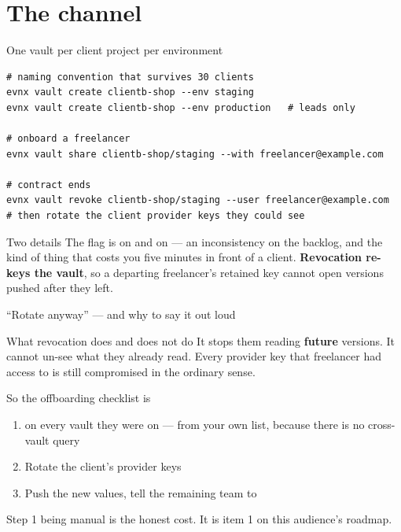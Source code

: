 \documentclass[aspectratio=169,10pt]{beamer}
\begin{document}
\section{The channel}

\begin{frame}[fragile]{One vault per client project per environment}
\begin{lstlisting}[style=evnxcode]
# naming convention that survives 30 clients
evnx vault create clientb-shop --env staging
evnx vault create clientb-shop --env production   # leads only

# onboard a freelancer
evnx vault share clientb-shop/staging --with freelancer@example.com

# contract ends
evnx vault revoke clientb-shop/staging --user freelancer@example.com
# then rotate the client provider keys they could see
\end{lstlisting}

  \vspace{0.5em}
  \begin{block}{Two details}
    The flag is  on  and  on
     --- an inconsistency on the backlog, and the kind of thing
    that costs you five minutes in front of a client.
    \textbf{Revocation re-keys the vault}, so a departing freelancer's retained
    key cannot open versions pushed after they left.
  \end{block}
\end{frame}

\begin{frame}{``Rotate anyway'' --- and why to say it out loud}
  \begin{block}{What revocation does and does not do}
    It stops them reading \textbf{future} versions. It cannot un-see what they
    already read. Every provider key that freelancer had access to is still
    compromised in the ordinary sense.
  \end{block}

  \vspace{0.9em}
  \begin{block}{So the offboarding checklist is}
    \begin{enumerate}
      \item {} on every vault they were on --- from your own
            list, because there is no cross-vault query
      \item Rotate the client's provider keys
      \item Push the new values, tell the remaining team to 
    \end{enumerate}
  \end{block}

  \vspace{0.4em}
  {\footnotesize Step 1 being manual is the honest cost. It is item 1 on this
  audience's roadmap.}
\end{frame}
\end{document}

